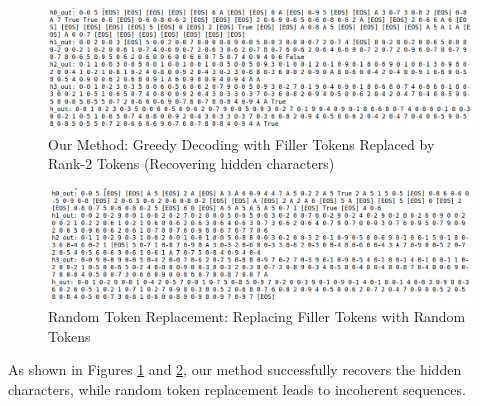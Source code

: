 \documentclass{article}
\begin{document}
\begin{figure}[H]
    \centering
    \includegraphics[width=\textwidth]{our_method_decoding.png}
    \caption{Our Method: Greedy Decoding with Filler Tokens Replaced by Rank-2 Tokens (Recovering hidden characters)}
    \label{fig:our-method}
\end{figure}

\begin{figure}[H]
    \centering
    \includegraphics[width=\textwidth]{random_tokens_decoding.png}
    \caption{Random Token Replacement: Replacing Filler Tokens with Random Tokens}
    \label{fig:random}
\end{figure}

As shown in Figures \ref{fig:our-method} and \ref{fig:random}, our method successfully recovers the hidden characters, while random token replacement leads to incoherent sequences.
\end{document}
